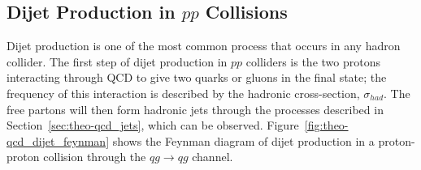 
\subsection{Dijet Production in $pp$ Collisions}
\label{sec:theo-qcd_dijet}


Dijet production is one of the most common process that occurs in any hadron collider.
The first step of dijet production in $pp$ colliders is the two protons interacting through QCD to give two quarks or gluons in the final state;
the frequency of this interaction is described by the hadronic cross-section, $\sigma_{had}$.
The free partons will then form hadronic jets through the processes described in Section~\ref{sec:theo-qcd_jets}, which can be observed.
Figure~\ref{fig:theo-qcd_dijet_feynman} shows the Feynman diagram of
dijet production in a proton-proton collision through the $qg \to qg$ channel.

